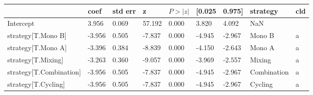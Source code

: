 \begin{tabular}{lllllllll}
\toprule
 & coef & std err & z & $P>|z|$ & [0.025 & 0.975] & strategy & cld \\
\midrule
Intercept & 3.956 & 0.069 &    57.192 &  0.000 & 3.820 & 4.092 & NaN &  \\
strategy[T.Mono B] & -3.956 & 0.505 &    -7.837 &  0.000 & -4.945 & -2.967 & Mono B & a \\
strategy[T.Mono A] & -3.396 & 0.384 &    -8.839 &  0.000 & -4.150 & -2.643 & Mono A & a \\
strategy[T.Mixing] & -3.263 & 0.360 &    -9.057 &  0.000 & -3.969 & -2.557 & Mixing & a \\
strategy[T.Combination] & -3.956 & 0.505 &    -7.837 &  0.000 & -4.945 & -2.967 & Combination & a \\
strategy[T.Cycling] & -3.956 & 0.505 &    -7.837 &  0.000 & -4.945 & -2.967 & Cycling & a \\
\bottomrule
\end{tabular}
